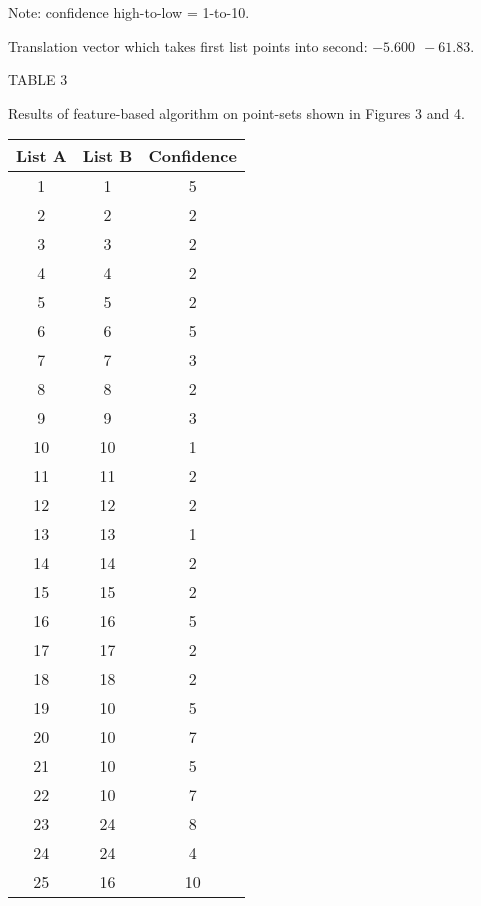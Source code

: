 \begin{table}
\begin{center}
\bigskip

Note: confidence high-to-low = 1-to-10.

\medskip

Translation vector which takes first list points into second: 
$-5.600 \ \ -61.83$.

\medskip


\bigskip

\bigskip

\bigskip

\bigskip


\end{center}
\end{table}

\newpage 
\begin{table}
\begin{center}

TABLE 3

\smallskip

Results of feature-based algorithm on point-sets shown in Figures 
3 and 4.

\bigskip

\bigskip

\bigskip

\begin{tabular}{c c c} \hline
List A  & List B & Confidence \\ \hline
       1  &     1   &    5  \\ 
       2  &     2   &    2  \\
       3  &     3   &    2   \\
       4  &     4   &    2  \\
       5  &     5   &    2   \\
       6  &     6   &    5  \\
       7  &     7   &    3  \\
       8  &     8   &    2  \\
       9  &     9   &    3  \\
      10  &    10   &    1   \\
      11  &    11   &    2  \\
      12  &    12   &    2   \\
      13  &    13   &    1  \\
      14  &    14   &    2   \\
      15  &    15   &    2   \\
      16  &    16   &    5   \\
      17  &    17   &    2  \\
      18  &    18   &    2  \\
      19  &    10   &   5 \\
      20  &    10   &    7  \\ 
      21  &    10   &    5   \\
      22  &    10   &    7   \\
      23  &    24   &    8   \\
      24  &    24   &    4   \\
      25  &    16   &   10  \\ \hline \hline
\end{tabular}


\end{center}
\end{table}
